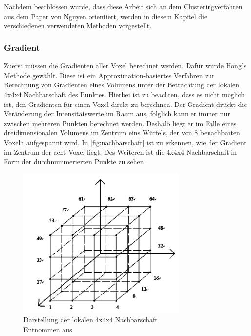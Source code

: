 \chapter{}
\label{sec:methods}

Nachdem beschlossen wurde, dass diese Arbeit sich an dem Clusteringverfahren aus dem Paper von Nguyen \cite{nguyen2012clustering} orientiert, werden in diesem Kapitel die verschiedenen verwendeten Methoden vorgestellt.

\subsection{Gradient}

Zuerst müssen die Gradienten aller Voxel berechnet werden. Dafür wurde Hong's Methode \cite{hong2003method} gewählt. Diese ist ein Approximation-basiertes Verfahren zur Berechnung von Gradienten eines Volumens unter der Betrachtung der lokalen 4x4x4 Nachbarschaft des Punktes.
\newline
Hierbei ist zu beachten, dass es nicht möglich ist, den Gradienten für einen Voxel direkt zu berechnen. Der Gradient drückt die Veränderung der Intensitätswerte im Raum aus, folglich kann er immer nur zwischen mehreren Punkten berechnet werden. Deshalb liegt er im Falle eines dreidimensionalen Volumens im Zentrum eins Würfels, der von 8 benachbarten Voxeln aufgespannt wird.
\newline
In \autoref{fig:nachbarschaft} ist zu erkennen, wie der Gradient im Zentrum der acht Voxel liegt. Des Weiteren ist die 4x4x4 Nachbarschaft in Form der durchnummerierten Punkte zu sehen.
\newline

\begin{figure}[!h] 
\centering 
\includegraphics[width=0.75\textwidth]{Logos/VoxelEdges.PNG}
\caption{Darstellung der lokalen 4x4x4 Nachbarschaft  \\ Entnommen aus \protect\cite{hong2003method}} 
\label{fig:nachbarschaft} 
\end{figure}


